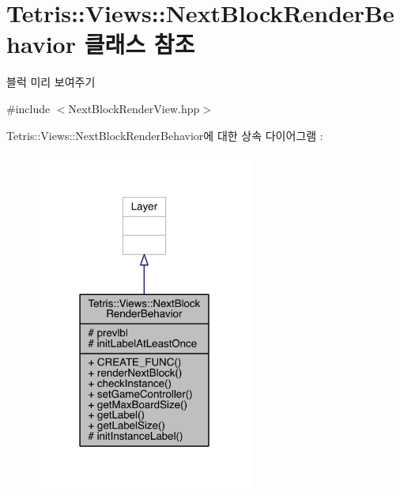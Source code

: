 \hypertarget{class_tetris_1_1_views_1_1_next_block_render_behavior}{}\section{Tetris\+:\+:Views\+:\+:Next\+Block\+Render\+Behavior 클래스 참조}
\label{class_tetris_1_1_views_1_1_next_block_render_behavior}


블럭 미리 보여주기  




{\ttfamily \#include $<$Next\+Block\+Render\+View.\+hpp$>$}



Tetris\+:\+:Views\+:\+:Next\+Block\+Render\+Behavior에 대한 상속 다이어그램 \+: 
\nopagebreak
\begin{figure}[H]
\begin{center}
\leavevmode
\includegraphics[width=202pt]{class_tetris_1_1_views_1_1_next_block_render_behavior__inherit__graph}
\end{center}
\end{figure}


